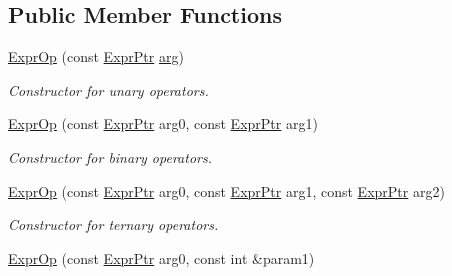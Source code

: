 \subsection*{Public Member Functions}
\begin{DoxyCompactItemize}
\item 
\mbox{\label{classilang_1_1_expr_op_af6527ce8fb830580d7fd9741e18fe246}} 
\mbox{\hyperlink{classilang_1_1_expr_op_af6527ce8fb830580d7fd9741e18fe246}{Expr\+Op}} (const \mbox{\hyperlink{classilang_1_1_expr_a85952b6a34620c4c8cab6bac9c9fdf8c}{Expr\+Ptr}} \mbox{\hyperlink{classilang_1_1_expr_a754c28cd350d28c7bdc8fffe7fe22ec2}{arg}})
\begin{DoxyCompactList}\small\item\em Constructor for unary operators. \end{DoxyCompactList}\item 
\mbox{\label{classilang_1_1_expr_op_a1bab22e0a48a3be3bdc5805d78a0b1a6}} 
\mbox{\hyperlink{classilang_1_1_expr_op_a1bab22e0a48a3be3bdc5805d78a0b1a6}{Expr\+Op}} (const \mbox{\hyperlink{classilang_1_1_expr_a85952b6a34620c4c8cab6bac9c9fdf8c}{Expr\+Ptr}} arg0, const \mbox{\hyperlink{classilang_1_1_expr_a85952b6a34620c4c8cab6bac9c9fdf8c}{Expr\+Ptr}} arg1)
\begin{DoxyCompactList}\small\item\em Constructor for binary operators. \end{DoxyCompactList}\item 
\mbox{\label{classilang_1_1_expr_op_a65a7be5afed3ff5825c5d37e565564d2}} 
\mbox{\hyperlink{classilang_1_1_expr_op_a65a7be5afed3ff5825c5d37e565564d2}{Expr\+Op}} (const \mbox{\hyperlink{classilang_1_1_expr_a85952b6a34620c4c8cab6bac9c9fdf8c}{Expr\+Ptr}} arg0, const \mbox{\hyperlink{classilang_1_1_expr_a85952b6a34620c4c8cab6bac9c9fdf8c}{Expr\+Ptr}} arg1, const \mbox{\hyperlink{classilang_1_1_expr_a85952b6a34620c4c8cab6bac9c9fdf8c}{Expr\+Ptr}} arg2)
\begin{DoxyCompactList}\small\item\em Constructor for ternary operators. \end{DoxyCompactList}\item 
\mbox{\label{classilang_1_1_expr_op_a2de25bcfe15aac150769b78c082c54b2}} 
\mbox{\hyperlink{classilang_1_1_expr_op_a2de25bcfe15aac150769b78c082c54b2}{Expr\+Op}} (const \mbox{\hyperlink{classilang_1_1_expr_a85952b6a34620c4c8cab6bac9c9fdf8c}{Expr\+Ptr}} arg0, const int \&param1)

\end{DoxyCompactItemize}
